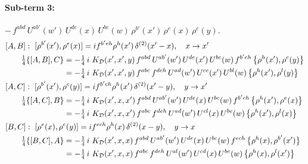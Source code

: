 \documentclass[10pt]{article}
\numberwithin{equation}{section}
\begin{document}
\paragraph{Sub-term 3:} $-\,f^{abd}\,U^{ab'}(w')\,U^{de}(x)\,U^{bc}(w)\,\rho^{b'}(x')\,\rho^{e}(x)\,\rho^{c}(y)$.
\begin{align}
&[A,B]:\ [\rho^{b'}(x'),\rho^{e}(x)]=i f^{b'eh}\rho^{h}(x')\,\delta^{(2)}(x'-x),\quad x\to x'\notag\\
&\qquad \tfrac14\{[A,B],C\}=-\tfrac14\,i\,\,K_{\mathcal D}(x',x',y)\,f^{abd}\,U^{ab'}(w')\,U^{de}(x')\,U^{bc}(w)\,f^{b'eh}\,\big\{\rho^{h}(x'),\rho^{c}(y)\big\}\notag\\
&\qquad\phantom{\tfrac14\{[A,B],C\}}=-\tfrac14\,i\,\,K_{\mathcal D}(x',x',y)\,f^{abc}\,f^{deh}\,U^{ad}(w')\,U^{ce}(x')\,U^{bl}(w)\,\big\{\rho^{h}(x'),\rho^{l}(y)\big\}
\label{eq:D-3-AB}\\
&[A,C]:\ [\rho^{b'}(x'),\rho^{c}(y)]=i f^{b'ch}\rho^{h}(x')\,\delta^{(2)}(x'-y),\quad y\to x'\notag\\
&\qquad \tfrac14\{[A,C],B\}=-\tfrac14\,i\,\,K_{\mathcal D}(x',x,x')\,f^{abd}\,U^{ab'}(w')\,U^{de}(x)\,U^{bc}(w)\,f^{b'ch}\,\big\{\rho^{h}(x'),\rho^{e}(x)\big\}\notag\\
&\qquad\phantom{\tfrac14\{[A,C],B\}}=-\tfrac14\,i\,\,K_{\mathcal D}(x',x,x')\,f^{abc}\,f^{deh}\,U^{ad}(w')\,U^{cl}(x)\,U^{be}(w)\,\big\{\rho^{h}(x'),\rho^{l}(x)\big\}
\label{eq:D-3-AC}\\
&[B,C]:\ [\rho^{e}(x),\rho^{c}(y)]=i f^{ech}\rho^{h}(x)\,\delta^{(2)}(x-y),\quad y\to x\notag\\
&\qquad \tfrac14\{[B,C],A\}=-\tfrac14\,i\,\,K_{\mathcal D}(x',x,x)\,f^{abd}\,U^{ab'}(w')\,U^{de}(x)\,U^{bc}(w)\,f^{ech}\,\big\{\rho^{h}(x),\rho^{b'}(x')\big\}\notag\\
&\qquad\phantom{\tfrac14\{[B,C],A\}}=-\tfrac14\,i\,\,K_{\mathcal D}(x',x,x)\,f^{abc}\,f^{deh}\,U^{al}(w')\,U^{cd}(x)\,U^{be}(w)\,\big\{\rho^{h}(x),\rho^{l}(x')\big\}
\label{eq:D-3-BC}
\end{align}
\end{document}
